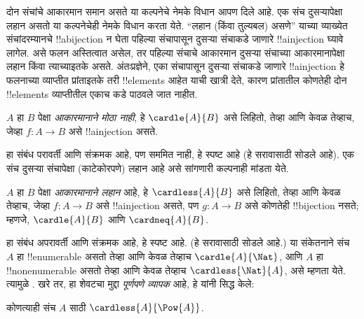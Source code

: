 \documentclass[../../../include/open-logic-section]{subfiles}
\begin{document}


\begin{explain}
दोन संचांचे आकारमान समान असते या कल्पनेचे नेमके विधान आपण दिले आहे.
एक संच दुसऱ्यापेक्षा लहान असतो या कल्पनेचेही नेमके विधान करता येते.
``लहान (किंवा तुल्यबल) असणे'' याच्या व्याख्येत संचांदरम्यानचे
!!a{bijection} न घेता पहिल्या संचापासून दुसऱ्या संचाकडे जाणारे
!!a{injection} घ्यावे लागेल. असे फलन अस्तित्वात असेल, तर पहिल्या
संचाचे आकारमान दुसऱ्या संचाच्या आकारमानापेक्षा लहान किंवा त्याच्याइतके
असते. अंतःप्रज्ञेने, एका संचापासून दुसऱ्या संचाकडे जाणारे
!!a{injection} हे फलनाच्या व्याप्तीत प्रांताइतके तरी !!{element}s आहेत
याची खात्री देते, कारण प्रांतातील कोणतेही दोन !!{element}s व्याप्तीतील
एकाच कडे पाठवले जात नाहीत.
\end{explain}

\begin{defn}
$A$ हा $B$ पेक्षा \emph{आकारमानाने मोठा नाही}, हे $\cardle{A}{B}$ असे
लिहितो, तेव्हा आणि केवळ तेव्हाच, जेव्हा $f \colon A \to B$ असे
!!a{injection} असते.
\end{defn}

हा संबंध परावर्ती आणि संक्रमक आहे, पण सममित नाही, हे स्पष्ट आहे (हे
सरावासाठी सोडले आहे). एक संच दुसऱ्या संचापेक्षा (काटेकोरपणे) लहान आहे
असे सांगणारी कल्पनाही मांडता येते.

\begin{defn}
$A$ हा $B$ पेक्षा \emph{आकारमानाने लहान} आहे, हे $\cardless{A}{B}$ असे
लिहितो, तेव्हा आणि केवळ तेव्हाच, जेव्हा $f\colon A \to B$ असे
!!a{injection} असते, पण $g\colon A
\to B$ असे कोणतेही !!{bijection} नसते; म्हणजे, $\cardle{A}{B}$ आणि
$\cardneq{A}{B}$.
\end{defn}

हा संबंध अपरावर्ती आणि संक्रमक आहे, हे स्पष्ट आहे. (हे सरावासाठी
सोडले आहे.) या संकेतनाने संच $A$ हा !!{enumerable} असतो तेव्हा आणि
केवळ तेव्हाच $\cardle{A}{\Nat}$, आणि $A$ हा !!{nonenumerable} असतो
तेव्हा आणि केवळ तेव्हाच $\cardless{\Nat}{A}$, असे म्हणता येते. त्यामुळे
.
खरे तर, हा शेवटचा मुद्दा \emph{पूर्णपणे व्यापक} आहे, हे
\citet{Cantor1892} यांनी सिद्ध केले:

\begin{thm}[कँटर]
कोणत्याही संच $A$ साठी $\cardless{A}{\Pow{A}}$.
\end{thm}
\end{document}
